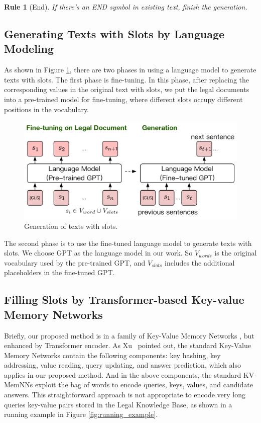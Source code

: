 \documentclass{article}
\newtheorem{controlrule}{Rule}
\begin{document}
\begin{controlrule}[End]
If there's an END symbol in existing text, finish the generation. 
\end{controlrule}

\subsection{Generating Texts with Slots by Language Modeling}
As shown in Figure \ref{fig:generation}, there are two phases in using a language model to generate texts with slots. 
The first phase is fine-tuning.
In this phase, after replacing the corresponding values in the original text with slots, we put the legal documents into a pre-trained model for fine-tuning, where different slots occupy different positions in the vocabulary. 

\begin{figure}[!htbp]
\centering 
\includegraphics[width=1.0\columnwidth]{img/generation.pdf} 
\caption{Generation of texts with slots.} 
\label{fig:generation} 
\end{figure}

The second phase is to use the fine-tuned language model to generate texts with slots. 
We choose GPT as the language model in our work. 
So $V_{words}$ is the original vocabulary used by the pre-trained GPT, and $V_{slots}$ includes the additional placeholders in the fine-tuned GPT. 

\subsection{Filling Slots by Transformer-based Key-value Memory Networks}
\label{sec:TKVMemNN}
Briefly, our proposed method is in a family of Key-Value Memory Networks \cite{miller2016kvmemnn,das-etal-2017-textkbqa,xu2019enhancing}, but enhanced by Transformer encoder. 
As Xu~ pointed out, the standard Key-Value Memory Networks contain the following components: key hashing, key addressing, value reading, query updating, and answer prediction, which also applies in our proposed method. 
And in the above components, the standard KV-MemNNs exploit the bag of words to encode queries, keys, values, and candidate answers. 
This straightforward approach is not appropriate to encode very long queries key-value pairs stored in the Legal Knowledge Base, as shown in a running example in Figure \ref{fig:running_example}. 
\end{document}
